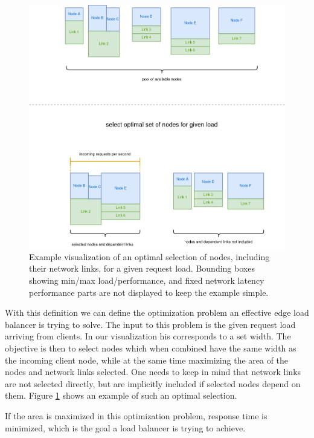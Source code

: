 \begin{figure}
    \centering
    \includegraphics[width=14cm]{graphics/diagrams/lb_optimal_selection.png}
    \caption{Example visualization of an optimal selection of nodes, including their network links, for a given request load. Bounding boxes showing min/max load/performance, and fixed network latency performance parts are not displayed to keep the example simple.}
    \label{fig:lb_optimal_load}
\end{figure}

With this definition we can define the optimization problem an effective edge load balancer is trying to solve. The input to this problem is the given request load arriving from clients. In our visualization his corresponds to a set width. The objective is then to select nodes which when combined have the same width as the incoming client node, while at the same time maximizing the area of the nodes and network links selected. One needs to keep in mind that network links are not selected directly, but are implicitly included if selected nodes depend on them. Figure \ref{fig:lb_optimal_load} shows an example of such an optimal selection.

If the area is maximized in this optimization problem, response time is minimized, which is the goal a load balancer is trying to achieve.



